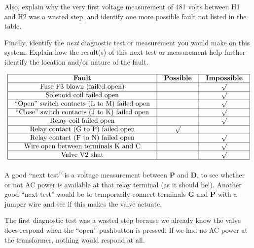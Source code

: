 Also, explain why the very first voltage measurement of 481 volts between H1 and H2 was a wasted step, and identify one more possible fault not listed in the table.

Finally, identify the {\it next} diagnostic test or measurement you would make on this system.  Explain how the result(s) of this next test or measurement help further identify the location and/or nature of the fault.








$$\vbox{\offinterlineskip
\halign{\strut
\vrule \quad\hfil # \ \hfil & 
\vrule \quad\hfil # \ \hfil & 
\vrule \quad\hfil # \ \hfil \vrule \cr
\noalign{\hrule}
%
{\bf Fault} & {\bf Possible} & {\bf Impossible} \cr
%
\noalign{\hrule}
%
Fuse F3 blown (failed open) &  & $\surd$ \cr
%
\noalign{\hrule}
%
Solenoid coil failed open &  & $\surd$ \cr
%
\noalign{\hrule}
%
``Open'' switch contacts (L to M) failed open &  & $\surd$ \cr
%
\noalign{\hrule}
%
``Close'' switch contacts (J to K) failed open &  & $\surd$ \cr
%
\noalign{\hrule}
%
Relay coil failed open &  & $\surd$ \cr
%
\noalign{\hrule}
%
Relay contact (G to P) failed open & $\surd$ &  \cr
%
\noalign{\hrule}
%
Relay contact (F to N) failed open &  & $\surd$ \cr
%
\noalign{\hrule}
%
Wire open between terminals K and C &  & $\surd$ \cr
%
\noalign{\hrule}
%
Valve V2 shut &  & $\surd$ \cr
%
\noalign{\hrule}
} %
}$$ %

A good ``next test'' is a voltage measurement between {\bf P} and {\bf D}, to see whether or not AC power is available at that relay terminal (as it should be!).  Another good ``next test'' would be to temporarily connect terminals {\bf G} and {\bf P} with a jumper wire and see if this makes the valve actuate.







The first diagnostic test was a wasted step because we already know the valve does respond when the ``open'' pushbutton is pressed.  If we had no AC power at the transformer, nothing would respond at all.


